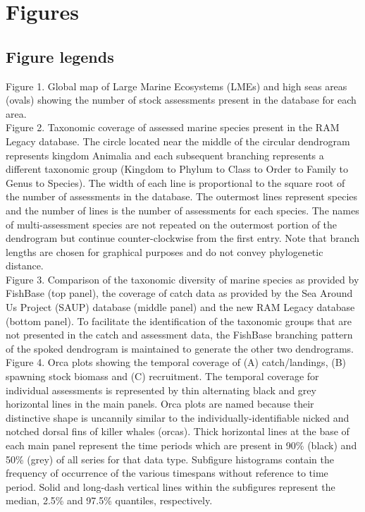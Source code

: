 \section*{Figures}
\subsection*{Figure legends}

\noindent Figure 1. Global map of Large Marine Ecosystems (LMEs) and
high seas areas (ovals) showing the number of stock assessments present in the database for each area. \\

\noindent Figure 2. Taxonomic coverage of assessed marine species present in the
RAM Legacy database. The circle located near the middle of the circular
dendrogram represents kingdom Animalia and each subsequent branching
represents a different taxonomic group (Kingdom to Phylum to Class to
Order to Family to Genus to Species). The width of each line is
proportional to the square root of the number of assessments in the
database. The outermost lines represent species and the number of
lines is the number of assessments for each species. The names of
multi-assessment species are not repeated on the outermost portion of
the dendrogram but continue counter-clockwise from the first entry.
Note that branch lengths are chosen for graphical purposes and do not
convey phylogenetic distance.\\ 

\noindent Figure 3. Comparison of the taxonomic diversity of marine
species as provided by FishBase (top panel), the coverage of catch
data as provided by the Sea Around Us Project (SAUP) database (middle
panel) and the new RAM Legacy database (bottom panel). To facilitate the
identification of the taxonomic groups that are not presented in the catch
and assessment data, the FishBase branching pattern of the spoked dendrogram is
maintained to generate the other two dendrograms.\\ 


\noindent Figure 4. Orca plots showing the temporal coverage of (A)
catch/landings, (B) spawning stock biomass and (C) recruitment. The
temporal coverage for individual assessments is represented by thin
alternating black and grey horizontal lines in the main panels. Orca
plots are named because their distinctive shape is uncannily similar
to the individually-identifiable nicked and notched dorsal fins of
killer whales (orcas). Thick horizontal lines at the base of each main
panel represent the time periods which are present in 90\% (black) and
50\% (grey) of all series for that data type.  Subfigure histograms
contain the frequency of occurrence of the various timespans without
reference to time period. Solid and long-dash vertical lines within
the subfigures represent the median,
2.5\% and 97.5\% quantiles, respectively.\\

